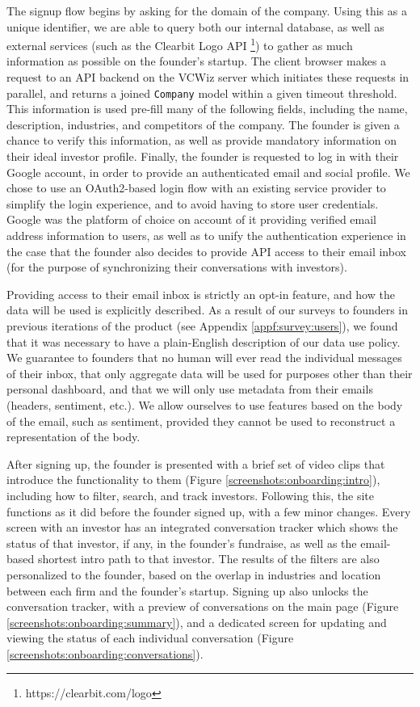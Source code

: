 The signup flow begins by asking for the domain of the company. Using this as a unique identifier, we are able to query both our internal database, as well as external services (such as the Clearbit Logo API \footnote{https://clearbit.com/logo}) to gather as much information as possible on the founder's startup. The client browser makes a request to an API backend on the VCWiz server which initiates these requests in parallel, and returns a joined \texttt{Company} model within a given timeout threshold. This information is used pre-fill many of the following fields, including the name, description, industries, and competitors of the company. The founder is given a chance to verify this information, as well as provide mandatory information on their ideal investor profile. Finally, the founder is requested to log in with their Google account, in order to provide an authenticated email and social profile. We chose to use an OAuth2-based \cite{hardt2012oauth} login flow with an existing service provider to simplify the login experience, and to avoid having to store user credentials. Google was the platform of choice on account of it providing verified email address information to users, as well as to unify the authentication experience in the case that the founder also decides to provide API access to their email inbox (for the purpose of synchronizing their conversations with investors).

Providing access to their email inbox is strictly an opt-in feature, and how the data will be used is explicitly described. As a result of our surveys to founders in previous iterations of the product (see Appendix \ref{appf:survey:users}), we found that it was necessary to have a plain-English description of our data use policy. We guarantee to founders that no human will ever read the individual messages of their inbox, that only aggregate data will be used for purposes other than their personal dashboard, and that we will only use metadata from their emails (headers, sentiment, etc.).  We allow ourselves to use features based on the body of the email, such as sentiment, provided they cannot be used to reconstruct a representation of the body.

After signing up, the founder is presented with a brief set of video clips that introduce the functionality to them (Figure \ref{screenshots:onboarding:intro}), including how to filter, search, and track investors. Following this, the site functions as it did before the founder signed up, with a few minor changes. Every screen with an investor has an integrated conversation tracker which shows the status of that investor, if any, in the founder's fundraise, as well as the email-based shortest intro path to that investor. The results of the filters are also personalized to the founder, based on the overlap in industries and location between each firm and the founder's startup. Signing up also unlocks the conversation tracker, with a preview of conversations on the main page (Figure \ref{screenshots:onboarding:summary}), and a dedicated screen for updating and viewing the status of each individual conversation (Figure \ref{screenshots:onboarding:conversations}).

